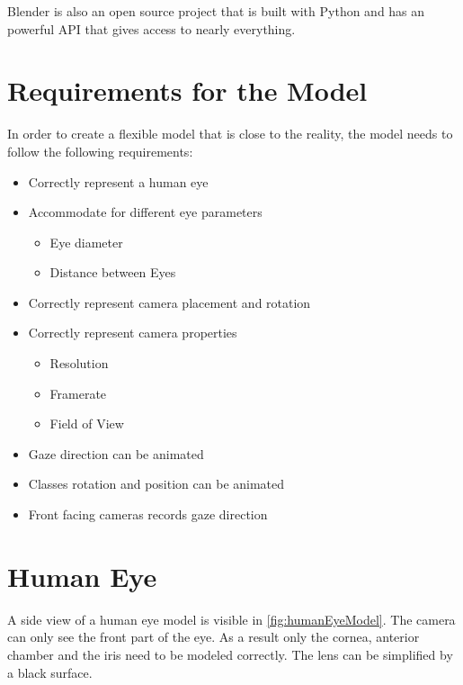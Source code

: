 Blender is also an open source project that is built with Python and has an powerful API that gives access to nearly everything.
\section{Requirements for the Model}
In order to create a flexible model that is close to the reality, the model needs to follow the following requirements:
\begin{itemize}
	\item Correctly represent a human eye
	\item Accommodate for different eye parameters
	\begin{itemize}
		\item Eye diameter
		\item Distance between Eyes
	\end{itemize}
	\item Correctly represent camera placement and rotation
	\item Correctly represent camera properties
	\begin{itemize}
		\item Resolution
		\item Framerate
		\item Field of View
	\end{itemize}
	\item Gaze direction can be animated
	\item Classes rotation and position can be animated
	\item Front facing cameras records gaze direction
\end{itemize}

\section{Human Eye}
A side view of a human eye model is visible in \ref{fig:humanEyeModel}. The camera can only see the front part of the eye. As a result only the cornea, anterior chamber and the iris need to be modeled correctly. The lens can be simplified by a black surface. 

